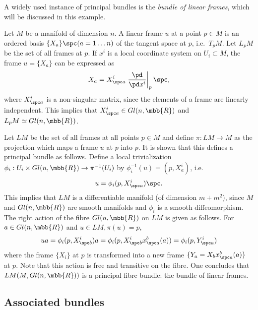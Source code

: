 \documentclass[10pt,reqno]{amsart}
\numberwithin{equation}{section}
\begin{document}
\begin{example}
	A widely used instance of principal bundles is the \emph{bundle 
		of linear frames}, which will be discussed in this example.

	Let $M$ be a manifold of dimension $n$. A linear frame $u$ at a 
	point $p \in M$ is an ordered basis $\{X_a\} \spc (a=1\ldots 
	n)$ of the tangent space at $p$, i.e.\ $T_pM$.  Let $L_pM$ be 
	the set of all frames at $p$. If $x^i$ is a local coordinate 
	system on $U_i \subset M$, the frame $u = \{X_a\}$ can be 
	expressed as
	\begin{equation}
		X_a = X^i_{\spc a} \left. \frac{\pd}{\pd x^i}\right|_{p} 
		\spc,
	\end{equation}
	where $X^i_{\spc a}$ is a non-singular matrix, since the 
	elements of a frame are linearly independent. This implies that 
	$X^i_{\spc a} \in Gl(n,\mbb{R})$ and $L_pM \simeq 
	Gl(n,\mbb{R})$.

	Let $LM$ be the set of all frames at all points $p \in M$ and 
	define $\pi : LM \rightarrow M$ as the projection which maps a 
	frame $u$ at $p$ into $p$. It is shown that this defines a 
	principal bundle as follows. Define a local trivialization 
	$\phi_i : U_i \times Gl(n,\mbb{R}) \rightarrow \pi^{-1}(U_i)$ 
	by $\phi_i^{-1}(u) = (p,X^i_a)$, i.e.\
	\begin{equation}
		u = \phi_i(p, X^i_{\spc a})\spc.
	\end{equation}
	This implies that $LM$ is a differentiable manifold (of 
	dimension $m + m^2$), since $M$ and $Gl(n,\mbb{R})$ are smooth 
	manifolds and $\phi_i$ is a smooth diffeomorphism. The right 
	action of the fibre $Gl(n,\mbb{R})$ on $LM$ is given as 
	follows. For $a \in Gl(n,\mbb{R})$ and $u \in LM, \pi(u) = p$,
	\begin{equation}
		ua = \phi_i(p,X^i_{\spc b}) a = \phi_i(p, X^i_{\spc 
			b}x^b_{\spc a}(a)) = \phi_i(p, Y^i_{\spc a})
	\end{equation}
	where the frame $\{X_i\}$ at $p$ is transformed into a new 
	frame $\{Y_a = X_b x^b_{\spc a}(a)\}$ at $p$. Note that this 
	action is free and transitive on the fibre. One concludes that 
	$LM(M,Gl(n,\mbb{R}))$ is a principal fibre bundle: the bundle 
	of linear frames.
\end{example}

\subsection{Associated bundles}
\end{document}
